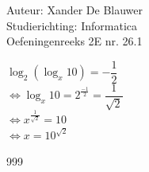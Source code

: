 \documentclass[a4paper]{article}
\begin{document}
\noindent \large Auteur: Xander De Blauwer \\
\noindent \large Studierichting: Informatica\\
\noindent \large Oefeningenreeks 2E nr. 26.1\\

\medskip

\normalsize


$\log_2(\log_x 10) = -\dfrac{1}{2}$ \\

$\Leftrightarrow \log_x 10 = 2^{\tfrac{-1}{2}} = \dfrac{1}{\sqrt{2}}$ \\

$\Leftrightarrow x^{\tfrac{1}{\sqrt{2}}} = 10$ \\

$\Leftrightarrow x = 10^{\sqrt{2}}$ \\








\begin{thebibliography}{999}
\end{thebibliography}
\end{document}
